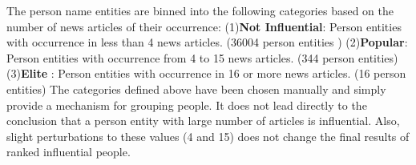 The person name entities are binned into the following categories based on the number of news articles of their occurrence:
(1)\textbf{Not Influential}: Person entities with occurrence in less than 4 news articles. (36004 person entities )
(2)\textbf{Popular}: Person entities with occurrence from 4 to 15 news articles. (344 person entities) 
(3)\textbf{Elite} : Person entities with occurrence in 16 or more news articles. (16 person entities)
The categories defined above have been chosen manually and simply provide a mechanism for grouping people. It does not lead directly to the conclusion that a person entity with large number of articles is influential. Also, slight perturbations to these values (4 and 15) does not change the final results of ranked influential people.

